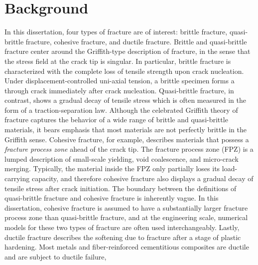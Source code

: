 \section{Background}

In this dissertation, four types of fracture are of interest: brittle fracture, quasi-brittle fracture, cohesive fracture, and ductile fracture. Brittle and quasi-brittle fracture center around the Griffith-type description of fracture, in the sense that the stress field at the crack tip is singular. In particular, brittle fracture is characterized with the complete loss of tensile strength upon crack nucleation. Under displacement-controlled uni-axial tension, a brittle specimen forms a through crack immediately after crack nucleation. Quasi-brittle fracture, in contrast, shows a gradual decay of tensile stress which is often measured in the form of a traction-separation law. Although the celebrated Griffith theory of fracture captures the behavior of a wide range of brittle and quasi-brittle materials, it bears emphasis that most materials are not perfectly brittle in the Griffith sense. Cohesive fracture, for example, describes materials that possess a \emph{fracture process zone} ahead of the crack tip. The fracture process zone (FPZ) is a lumped description of small-scale yielding, void coalescence, and micro-crack merging. Typically, the material inside the FPZ only partially loses its load-carrying capacity, and therefore cohesive fracture also displays a gradual decay of tensile stress after crack initiation. The boundary between the definitions of quasi-brittle fracture and cohesive fracture is inherently vague. In this dissertation, cohesive fracture is assumed to have a substantially larger fracture process zone than quasi-brittle fracture, and at the engineering scale, numerical models for these two types of fracture are often used interchangeably. Lastly, ductile fracture describes the softening due to fracture after a stage of plastic hardening. Most metals and fiber-reinforced cementitious composites are ductile and are subject to ductile failure,

